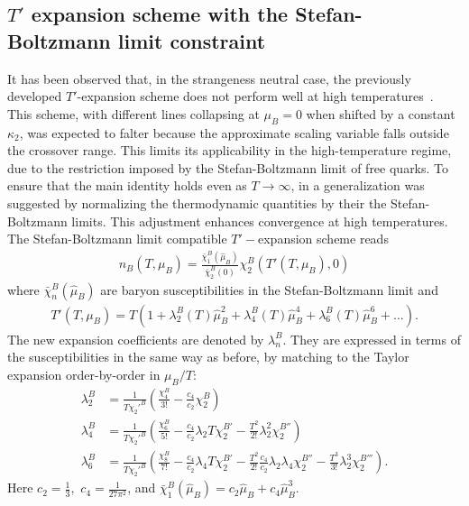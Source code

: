\documentclass[%
 reprint,
nofootinbib,
 amsmath,amssymb,
 aps,
prc
]{revtex4-2}
\begin{document}
\subsection{$T'$ expansion scheme with the Stefan-Boltzmann limit constraint}

It has been observed that, in the strangeness neutral case, the previously developed $T'$-expansion scheme 
does not perform well at high temperatures~\cite{Borsanyi:2022qlh}. 
This scheme, with different lines collapsing at $\mu_B=0$ when shifted by a constant $\kappa_2$, was expected to falter because the approximate scaling variable falls outside the crossover range. 
This limits its applicability in the high-temperature regime, due to the restriction imposed by the Stefan-Boltzmann limit of free quarks. 
To ensure that the main identity holds even as $T \rightarrow\infty$, in \cite{Borsanyi:2022qlh} a generalization was suggested by normalizing the thermodynamic quantities by their the Stefan-Boltzmann limits.
This adjustment enhances convergence at high temperatures.
The Stefan-Boltzmann limit compatible $T'-$expansion scheme reads 
\begin{align}
n_B(T,\mu_B) = \frac{\bar{\chi}_1^B(\hat{\mu}_B)}{\bar{\chi}_2^B(0)}\chi_2^B(T'(T,\mu_B),0)
\label{Eq:TprimenB_SB}
\end{align}
where  $\bar{\chi}_n^B(\hat{\mu}_B)$ are baryon susceptibilities in the Stefan-Boltzmann limit and
\begin{align}
\label{eq:TprimeSB}
T'(T,\mu_B) = T\left(1+\lambda_2^B(T)\hat{\mu}_B^2 + \lambda_4^B(T)\hat{\mu}_B^4 + \lambda_6^B(T)\hat{\mu}_B^6 + ...\right).
\end{align}
The new expansion coefficients are denoted by $\lambda_n^B$. 
They are expressed in terms of the susceptibilities in the same way as before, by matching to the Taylor expansion order-by-order in $\mu_B/T$:
\begin{align}
\nonumber
    \lambda_2^{B} &= \frac{1}{T\chi_2'^B} \left(\frac{\chi_4^B}{3!}-\frac{c_4}{c_2}\chi_2^B\right) \\ 
    \nonumber
    \lambda_4^{B} &= \frac{1}{T\chi_2'^{B}}\left(\frac{\chi_6^B}{5!} - \frac{c_4}{c_2}\lambda_2 T \chi_2^{B '}  -\frac{T^2}{2!} \lambda_2^2  \chi_2^{B ''}\right) \\ 
    \lambda_6^{B} &= \frac{1}{T\chi_2'^{B}}\left(\frac{\chi_8^B}{7!} - \frac{c_4}{c_2}\lambda_4 T \chi_2^{B '}  -\frac{T^2}{2!}\frac{c_4}{c_2} \lambda_2 \lambda_4 \chi_2^{B ''} - \frac{T^3}{3!} \lambda_2^3  \chi_2^{B'''}\right).
    \label{Eq:lambda}
\end{align}
Here 
$c_2 = \frac{1}{3},$ $c_4 = \frac{1}{27\pi^2}$, and $\bar{\chi}_1^B(\hat{\mu}_B) = c_2 \hat{\mu}_B + c_4 \hat{\mu}_B^3$.
\end{document}
